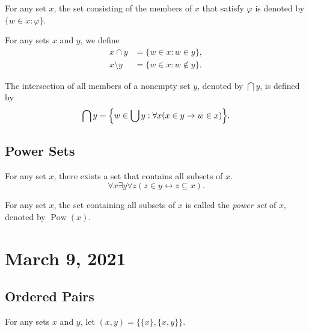 \documentclass[11pt]{article}
\DeclareMathOperator{\pow}{Pow}
\begin{document}
\begin{definition}
  For any set $x$, the set consisting of the members of $x$ that satisfy $\varphi$ is denoted by $\{w \in x: \varphi\}$.
\end{definition}

\begin{definition}
  For any sets $x$ and $y$, we define
  \begin{align*}
    x \cap y &= \{w \in x: w \in y\}, \\
    x \setminus y &= \{w \in x: w \notin y\}.
  \end{align*}
\end{definition}

\begin{definition}
  The intersection of all members of a nonempty set $y$, denoted by $\bigcap y$, is defined by
  \begin{equation*}
    \bigcap y = \Bigl\{w \in \bigcup y: \forall x (x \in y \to w \in x)\Bigr\}.
  \end{equation*}
\end{definition}

\subsection{Power Sets}
\begin{axiom}
  For any set $x$, there exists a set that contains all subsets of $x$.
  \begin{equation*}
    \forall x \exists y \forall z (z \in y \leftrightarrow z \subseteq x).
  \end{equation*}
\end{axiom}

\begin{definition}
  For any set $x$, the set containing all subsets of $x$ is called the \emph{power set} of $x$, denoted by $\pow(x)$.
\end{definition}

\section{March 9, 2021}
\subsection{Ordered Pairs}
\begin{definition}
  For any sets $x$ and $y$, let $(x, y) = \{\{x\}, \{x, y\}\}$.
\end{definition}
\end{document}
